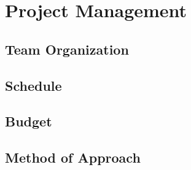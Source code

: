 \documentclass[ppfs.tex]{template/subfiles}
\begin{document}
\section{Project Management}
    \subsection{Team Organization}
    \subsection{Schedule}
    \subsection{Budget}
    \subsection{Method of Approach}
\end{document}
